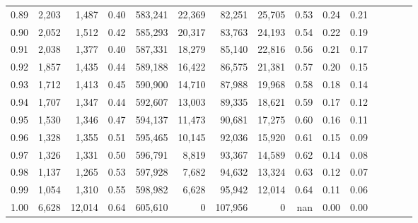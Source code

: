 \begin{tabular}{rrrcrrrrrrrrrrr}
0.89 &   2,203 &   1,487 &                                       0.40 &  583,241 &   22,369 &   82,251 &   25,705 &  0.53 &  0.24 &                         0.21 \\
0.90 &   2,052 &   1,512 &                                       0.42 &  585,293 &   20,317 &   83,763 &   24,193 &  0.54 &  0.22 &                         0.19 \\
0.91 &   2,038 &   1,377 &                                       0.40 &  587,331 &   18,279 &   85,140 &   22,816 &  0.56 &  0.21 &                         0.17 \\
0.92 &   1,857 &   1,435 &                                       0.44 &  589,188 &   16,422 &   86,575 &   21,381 &  0.57 &  0.20 &                         0.15 \\
0.93 &   1,712 &   1,413 &                                       0.45 &  590,900 &   14,710 &   87,988 &   19,968 &  0.58 &  0.18 &                         0.14 \\
0.94 &   1,707 &   1,347 &                                       0.44 &  592,607 &   13,003 &   89,335 &   18,621 &  0.59 &  0.17 &                         0.12 \\
0.95 &   1,530 &   1,346 &                                       0.47 &  594,137 &   11,473 &   90,681 &   17,275 &  0.60 &  0.16 &                         0.11 \\
0.96 &   1,328 &   1,355 &                                       0.51 &  595,465 &   10,145 &   92,036 &   15,920 &  0.61 &  0.15 &                         0.09 \\
0.97 &   1,326 &   1,331 &                                       0.50 &  596,791 &    8,819 &   93,367 &   14,589 &  0.62 &  0.14 &                         0.08 \\
0.98 &   1,137 &   1,265 &                                       0.53 &  597,928 &    7,682 &   94,632 &   13,324 &  0.63 &  0.12 &                         0.07 \\
0.99 &   1,054 &   1,310 &                                       0.55 &  598,982 &    6,628 &   95,942 &   12,014 &  0.64 &  0.11 &                         0.06 \\
1.00 &   6,628 &  12,014 &                                       0.64 &  605,610 &        0 &  107,956 &        0 &   nan &  0.00 &                         0.00 \\
\bottomrule
\end{tabular}
